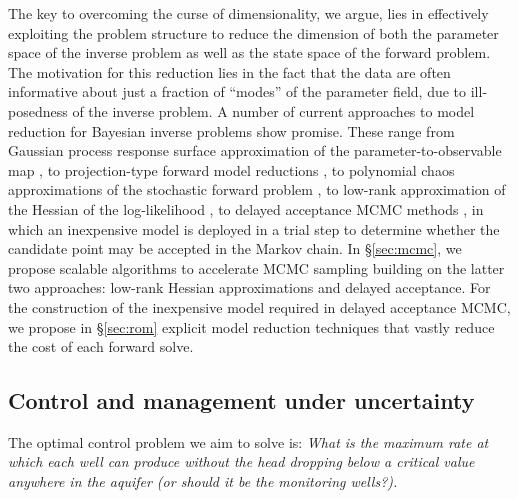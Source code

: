 \documentclass[11pt,final]{article}%
\begin{document}
The key to overcoming the curse of dimensionality, we argue, lies in
effectively exploiting the problem structure to
reduce the dimension of both the parameter space of the
inverse problem as well as the state space of the forward problem.
The motivation for this reduction lies in the fact that the data are
often informative about just a fraction of ``modes'' of the parameter
field, due to ill-posedness of the inverse problem.
%
A number of current approaches to model reduction for Bayesian inverse
problems show promise. These range from Gaussian process response
surface approximation of the parameter-to-observable map
\cite{Kennedy2001, Bui-ThanhGhattasHigdon12}, to projection-type
forward model reductions \cite{GalballyFidkowskiWillcoxEtAl10,
  lwgSISC2010,CuiMarzoukWillcox14}, to polynomial chaos approximations
of the stochastic forward problem \cite{MarzoukNajm09,
  GhanemDoostan06, BadriZabaras04}, to low-rank approximation of the
Hessian of the log-likelihood \cite{FlathWilcoxAkcelikEtAl11,
  MartinWilcoxBursteddeEtAl12,
  Bui-ThanhBursteddeGhattasEtAl12_gbfinalist,
  Bui-ThanhGhattasMartinEtAl13,CuiMartinMarzoukEtAl14}, to
delayed acceptance MCMC methods
\cite{EfendievHouLuo06,ChristenFox05,CuiMarzoukWillcox14}, in which
an inexpensive model is deployed in a trial step to determine whether the
candidate point may be accepted in the Markov chain.
%
In \S\ref{sec:mcmc}, we propose scalable algorithms to accelerate MCMC
sampling building on the latter two approaches: low-rank
Hessian approximations 
and delayed acceptance.  For the construction of the inexpensive model
required in delayed acceptance MCMC, we propose in \S\ref{sec:rom}
explicit model reduction techniques that vastly reduce the cost of each
forward solve.


\subsection{Control and management under uncertainty}
\label{sec:control}

The optimal control problem we aim to solve is: \emph{What is the maximum rate at which each well can produce without the head dropping below a critical value anywhere in the aquifer (or should it be the monitoring wells?).}
\end{document}
